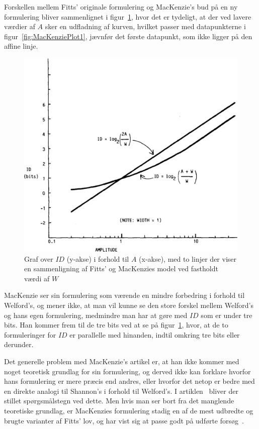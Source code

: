 Forskellen mellem Fitts' originale formulering og MacKenzie's bud på en ny formulering bliver sammenlignet i figur~\ref{fig:MacKenziePlot2}, hvor det er tydeligt, at der ved lavere værdier af $A$ sker en udfladning af kurven, hvilket passer med datapunkterne i figur~\ref{fig:MacKenziePlot1}, jævnfør det første datapunkt, som ikke ligger på den affine linje.
\begin{figure}[h]
\centering
\includegraphics[width=.5\linewidth]{images/illustrations/mackenzie_plot_2}
\caption{Graf over $ID$ (y-akse) i forhold til $A$ (x-akse), med to linjer der viser en sammenligning af Fitts' og MacKenzies model ved fastholdt værdi af $W$}
\label{fig:MacKenziePlot2}
\end{figure}

MacKenzie ser sin formulering som værende en mindre forbedring i forhold til Welford's, og mener ikke, at man vil kunne se den store forskel mellem Welford's og hans egen formulering, medmindre man har at gøre med $ID$ som er under tre bits. Han kommer frem til de tre bits ved at se på figur~\ref{fig:MacKenziePlot2}, hvor, at de to formuleringer for $ID$ er parallelle med hinanden, indtil omkring tre bits eller derunder.

Det generelle problem med MacKenzie's artikel er, at han ikke kommer med noget teoretisk grundlag for sin formulering, og derved ikke kan forklare hvorfor hans formulering er mere præcis end andres, eller hvorfor det netop er bedre med en direkte analogi til Shannon's i forhold til Welford's. I artiklen~\cite{drewes2010} bliver der stillet spørgsmålstegn ved dette. Men hvis man ser bort fra det manglende teoretiske grundlag, er MacKenzies formulering stadig en af de mest udbredte og brugte varianter af Fitts' lov, og har vist sig at passe godt på udførte forsøg~\cite{goldberg2015}.

